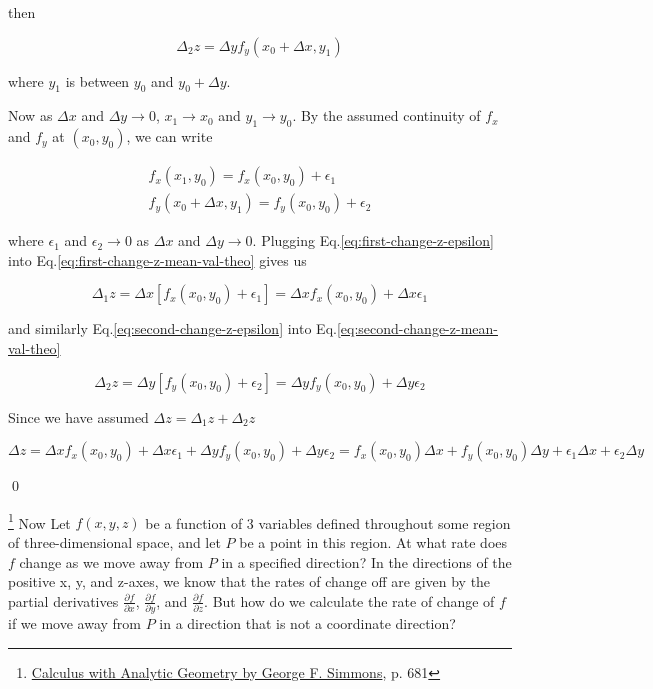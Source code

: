 then

\begin{equation}\label{eq:second-change-z-mean-val-theo}
\Delta_2 z = \Delta y f_y(x_0 + \Delta x, y_1)
\end{equation}

where $y_1$ is between $y_0$ and $y_0 + \Delta y$.

Now as $\Delta x$ and $\Delta y \rightarrow 0$, $x_1 \rightarrow x_0$ and $y_1 \rightarrow y_0$. By the assumed
continuity of $f_x$ and $f_y$ at $(x_0, y_0)$, we can write

\begin{align}
    f_x(x_1, y_0) = f_x(x_0, y_0) + \epsilon_1 \label{eq:first-change-z-epsilon} \\
    f_y(x_0 + \Delta x, y_1) = f_y(x_0, y_0) + \epsilon_2 \label{eq:second-change-z-epsilon}
\end{align}

where $\epsilon_1$ and $\epsilon_2 \rightarrow 0$ as $\Delta x$ and $\Delta y \rightarrow 0$. Plugging
Eq.\ref{eq:first-change-z-epsilon} into Eq.\ref{eq:first-change-z-mean-val-theo} gives us

\begin{equation}
    \Delta_1 z = \Delta x\left[ f_x(x_0, y_0) + \epsilon_1 \right] = \Delta x f_x(x_0, y_0) + \Delta x\epsilon_1
\end{equation}

and similarly Eq.\ref{eq:second-change-z-epsilon} into Eq.\ref{eq:second-change-z-mean-val-theo}

\begin{equation}
    \Delta_2 z = \Delta y\left[ f_y(x_0, y_0) + \epsilon_2 \right] = \Delta y f_y(x_0, y_0) + \Delta y\epsilon_2
\end{equation}

Since we have assumed $\Delta z = \Delta_1 z + \Delta_2 z$

\begin{equation}
    \Delta z = \Delta x f_x(x_0, y_0) + \Delta x\epsilon_1 + \Delta y f_y(x_0, y_0) + \Delta y\epsilon_2 = f_x(x_0, y_0)\Delta x + f_y(x_0, y_0)\Delta y + \epsilon_1\Delta x + \epsilon_2\Delta y
\end{equation}

\qed

\footnote{\href{https://trello.com/c/byu9Pyy8}{Calculus with Analytic Geometry by George F. Simmons}, p. 681} Now Let
$f(x, y, z)$ be a function of 3 variables defined throughout some region of three-dimensional space, and let $P$ be a
point in this region. At what rate does $f$ change as we move away from $P$ in a specified direction? In the directions
of the positive x, y, and z-axes, we know that the rates of change off are given by the partial derivatives
$\frac{\partial f}{\partial x}$, $\frac{\partial f}{\partial y}$, and $\frac{\partial f}{\partial z}$. But how do we
calculate the rate of change of $f$ if we move away from $P$ in a direction that is not a coordinate direction?

